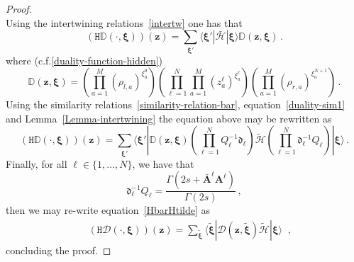 \documentclass[11pt]{article}
\numberwithin{equation}{section}
\newcommand{\OA}{\mathbf{A}}
\newcommand{\OAD}{\mathbf{\bar{A}}}
\newcommand{\M}{M}
\newcommand{\N}{N}
\newcommand{\eH}{\mathcal{H}}
\newcommand{\ecdH}{\mathtt{H}}
\newcommand{\heat}{z}
\begin{document}
\begin{proof}
\begin{equation}
\end{equation}
Using the intertwining relations~\eqref{intertw} one has that 
\begin{equation}
	\left(\ecdH \mathbb{D}(\cdot,\bm{\xi})\right)(\bm{\heat})=\sum_{\bm{\xi}'}\langle \bm{\xi}'|\bar{\eH}|\bm{\xi}\rangle \mathbb{D}(\bm{\heat},\bm{\xi}) \,.
\end{equation}
where (c.f.\eqref{duality-function-hidden})
 \begin{equation}
	\mathbb{D}(\bm{\heat},\bm{\xi})=\left(\prod_{a=1}^{\M}(\rho_{l,a})^{\xi_{a}^{0}}\right)\left(\prod_{\ell=1}^{\N}\prod_{a=1}^{\M}(\heat_{a}^{\ell})^{\xi_{a}^{\ell}}\right)\left(\prod_{a=1}^{\M}(\rho_{r,a})^{\xi_{a}^{\N+1}}\right)\,.
\end{equation}
Using the similarity relations~\eqref{similarity-relation-bar}, equation~\eqref{duality-sim1} and Lemma~\eqref{Lemma-intertwining} the equation above may be rewritten as
\begin{equation}\label{HbarHtilde}
	\left(\ecdH\mathbb{D}(\cdot,\bm{\xi})\right)(\bm{\heat})=\sum_{\bm{\xi}'}\langle \bm{\xi}'|\mathbb{D}(\bm{\heat},\bm{\xi})\left(\prod_{\ell=1}^{\N}Q_{\ell}^{-1}\mathfrak{d}_{\ell}\right)\widetilde{\eH}\left(\prod_{\ell=1}^{\N}\mathfrak{d}_{\ell}^{-1}Q_{\ell}\right)|\bm{\xi}\rangle \,.
\end{equation}
Finally, for all $\ell\in \{1,\ldots,\N\}$, we have that 
\begin{equation}
	\mathfrak{d}_{\ell}^{-1}Q_{\ell}=\frac{\Gamma(2s+\OAD^{\ell}\OA^{\ell})}{\Gamma(2s)}\,,
    \end{equation} then we may re-write equation~\eqref{HbarHtilde} as 
\begin{equation}
	\begin{split}
&\left(\ecdH\mathscr{D}(\cdot,\bm{\xi})\right)(\bm{\heat})=
\sum_{\tilde{\bm{\xi}}}\langle \tilde{\bm{\xi}}|\mathscr{D}(\bm{\heat},\tilde{\bm{\xi}})\widetilde{\eH}|\bm{\xi}\rangle
\end{split}\,,
\end{equation}
concluding the proof. 
\end{proof}
\end{document}
